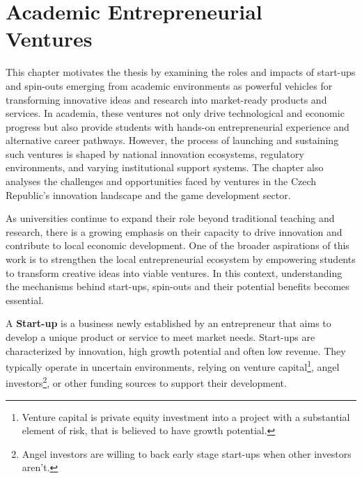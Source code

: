 \chapter{Academic Entrepreneurial Ventures}

\begin{chapterabstract}
	This chapter motivates the thesis by examining the roles and impacts of start-ups and spin-outs emerging from academic environments as powerful vehicles for transforming innovative ideas and research into market-ready products and services. In academia, these ventures not only drive technological and economic progress but also provide students with hands-on entrepreneurial experience and alternative career pathways. However, the process of launching and sustaining such ventures is shaped by national innovation ecosystems, regulatory environments, and varying institutional support systems. The chapter also analyses the challenges and opportunities faced by ventures in the Czech Republic’s innovation landscape and the game development sector.
\end{chapterabstract}

As universities continue to expand their role beyond traditional teaching and research, there is a growing emphasis on their capacity to drive innovation and contribute to local economic development. One of the broader aspirations of this work is to strengthen the local entrepreneurial ecosystem by empowering students to transform creative ideas into viable ventures. In this context, understanding the mechanisms behind start-ups, spin-outs and their potential benefits becomes essential.

A \textbf{Start-up} is a business newly established by an entrepreneur that aims to develop a unique product or service to meet market needs. Start-ups are characterized by innovation, high growth potential and often low revenue. They typically operate in uncertain environments, relying on venture capital\footnote{Venture capital is private equity investment into a project with a substantial element of risk, that is believed to have growth potential.}, angel investors\footnote{Angel investors are willing to back early stage start-ups when other investors aren't.}, or other funding sources to support their development.\cite{investopedia_start-ups}

